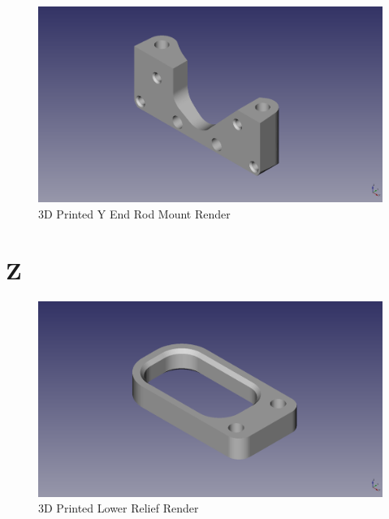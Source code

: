 \begin{figure}[H]
\centering
\includegraphics[keepaspectratio=true,angle=0,height=1.0\textheight,width=1.0\textwidth]{STL/yendrodmount.stl.png}
\caption{3D Printed Y End Rod Mount Render}
\label{fig:yendrodmountrender}
\end{figure}

\section{Z}

\begin{figure}[H]
\centering
\includegraphics[keepaspectratio=true,angle=0,height=1.0\textheight,width=1.0\textwidth]{STL/lowrelief.stl.png}
\caption{3D Printed Lower Relief Render}
\label{fig:lowreliefrender}
\end{figure}

